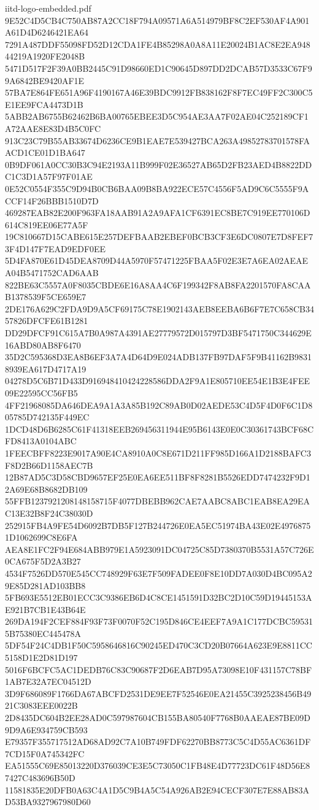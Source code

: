 \begin{filecontents*}[overwrite]{iitd-logo-embedded.pdf}
9E52C4D5CB4C750AB87A2CC18F794A09571A6A514979BF8C2EF530AF4A901A61D4D6246421EA64
7291A487DDF55098FD52D12CDA1FE4B85298A0A8A11E20024B1AC8E2EA94844219A1920FE2048B
5471D517F2F39A0BB2445C91D98660ED1C90645D897DD2DCAB57D3533C67F99A6842BE9420AF1E
57BA7E864FE651A96F4190167A46E39BDC9912FB838162F8F7EC49FF2C300C5E1EE9FCA4473D1B
5ABB2AB6755B62462B6BA00765EBEE3D5C954AE3AA7F02AE04C252189CF1A72AAE8E83D4B5C0FC
913C23C79B55AB33674D6236CE9B1EAE7E539427BCA263A49852783701578FAACD1CE01D1BA647
0B9DF061A0CC30B3C94E2193A11B999F02E36527AB65D2FB23AED4B8822DDC1C3D1A57F97F01AE
0E52C0554F355C9D94B0CB6BAA09B8BA922ECE57C4556F5AD9C6C5555F9ACCF14F26BBB1510D7D
469287EAB82E200F963FA18AAB91A2A9AFA1CF6391EC8BE7C919EE770106D614C819EE06E77A5F
19C810667D15CABE615E257DEFBAAB2EBEF0BCB3CF3E6DC0807E7D8FEF73F4D147F7EAD9EDF0EE
5D4FA870E61D45DEA8709D44A5970F57471225FBAA5F02E3E7A6EA02AEAEA04B5471752CAD6AAB
822BE63C5557A0F8035CBDE6E16A8AA4C6F199342F8AB8FA2201570FA8CAAB1378539F5CE659E7
2DE176A629C2FDA9D9A5CF69175C78E1902143AEB8EEBA6B6F7E7C658CB3457826DFCFE61B1281
DD29DFCF91C615A7B0A987A4391AE27779572D015797D3BF5471750C344629E16ABD80AB8F6470
35D2C595368D3EA8B6EF3A7A4D64D9E024ADB137FB97DAF5F9B41162B98318939EA617D4717A19
04278D5C6B71D433D916948410424228586DDA2F9A1E805710EE54E1B3E4FEE09E22595CC56FB5
4FF21968085DA646DEA9A1A3A85B192C89AB0D02AEDE53C4D5F4D0F6C1D805785D742135F449EC
1DCD48D6B6285C61F41318EEB269456311944E95B6143E0E0C30361743BCF68CFD8413A0104ABC
1FEECBFF8223E9017A90E4CA8910A0C8E671D211FF985D166A1D2188BAFC3F8D2B66D1158AEC7B
12B87AD5C3D58CBD9657EF25E0EA6EE511BF8F8281B5526EDD7474232F9D12A69E68B8682DB109
55FFB1237921208148158715F4077DBEBB962CAE7AABC8ABC1EAB8EA29EAC13E32B8F24C38030D
252915FB4A9FE54D6092B7DB5F127B244726E0EA5EC51974BA43E02E49768751D1062699C8E6FA
AEA8E1FC2F94E684ABB979E1A5923091DC04725C85D7380370B5531A57C726E0CA675F5D2A3B27
4534F7526DD570E545CC748929F63E7F509FADEE0F8E10DD7A030D4BC095A29E85D281AD103BB8
5FB693E5512EB01ECC3C9386EB6D4C8CE1451591D32BC2D10C59D19445153AE921B7CB1E43B64E
269DA194F2CEF884F93F73F0070F52C195D846CE4EEF7A9A1C177DCBC595315B75380EC445478A
5DF54F24C4DB1F50C5958646816C90245ED470C3CD20B07664A623E9E8811CC5158D1E2D81D197
5016F6BCFC5AC1DEDB76C83C90687F2D6EAB7D95A73098E10F431157C78BF1AB7E32A7EC04512D
3D9F686089F1766DA67ABCFD2531DE9EE7F52546E0EA21455C3925238456B4921C3083EEE0022B
2D8435DC604B2EE28AD0C597987604CB155BA80540F7768B0AAEAE87BE09D9D9A6E934759CB593
E79357F355717512AD68AD92C7A10B749FDF62270BB8773C5C4D55AC6361DF7CD15F0A745342FC
EA51555C69E85013220D376039CE3E5C73050C1FB48E4D77723DC61F48D56E87427C483696B50D
11581835E20DFB0A63C4A1D5C9B4A5C54A926AB2E94CECF307E7E88AB83AD53BA9327967980D60

\end{filecontents*}

